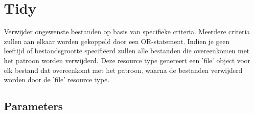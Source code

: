 \section{Tidy}

Verwijder ongewenste bestanden op basis van specifieke criteria. Meerdere criteria zullen aan elkaar worden gekoppeld door een OR-statement. Indien je geen leeftijd of bestandsgrootte specifi\"eerd zullen alle bestanden die overeenkomen met het patroon worden verwijderd. Deze resource type genereert een 'file' object voor elk bestand dat overeenkomt met het patroon, waarna de bestanden verwijderd worden door de 'file' resource type.

\subsection{Parameters}

